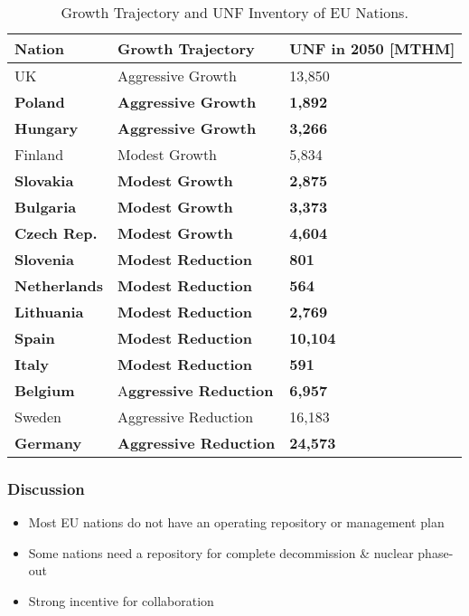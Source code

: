 \begin{frame}
\begin{table}[h]
\begin{adjustbox}{max totalsize={1.1\textwidth}{.8\textheight}, center}
\begin{tabularx}{\textwidth}{lbb}
                    \textbf{Nation} & \textbf{Growth Trajectory} & \small{\textbf{UNF in 2050 [MTHM] }}\\
                    \hline
                    UK & Aggressive Growth & 13,850\\
                    \hline
                    \textbf{Poland} & \textbf{Aggressive Growth} &  \textbf{1,892}\\
                    \hline
                    \textbf{Hungary} & \textbf{Aggressive Growth} & \textbf{3,266} \\ 
                    \hline
                    Finland & Modest Growth &  5,834\\
                    \hline
                    \textbf{Slovakia} & \textbf{Modest Growth} & \textbf{2,875}\\
                    \hline
                   \textbf{ Bulgaria} & \textbf{Modest Growth} & \textbf{3,373} \\
                    \hline
                    \textbf{Czech Rep.} & \textbf{Modest Growth} & \textbf{4,604}\\
                    \hline
                    \textbf{Slovenia} & \textbf{Modest Reduction} & \textbf{801}\\
                    \hline
                    \textbf{Netherlands} & \textbf{Modest Reduction} & \textbf{564}\\
                    \hline
                    \textbf{Lithuania} & \textbf{Modest Reduction} & \textbf{2,769}\\
                    \hline 
                    \textbf{Spain} & \textbf{Modest Reduction} &  \textbf{10,104} \\
                    \hline
                    \textbf{Italy} & \textbf{Modest Reduction} & \textbf{591}\\
                    \hline
                    \textbf{Belgium} & A\textbf{ggressive Reduction} & \textbf{6,957}\\
                    \hline
                    Sweden & Aggressive Reduction & 16,183\\
                    \hline
                    \textbf{Germany} & \textbf{Aggressive Reduction} & \textbf{24,573}\\
                    \hline
                    
                \end{tabularx}
    \end{adjustbox}
    \caption {Growth Trajectory and UNF Inventory of \gls{EU} Nations.}
    \label{tab:which_count}
\end{table}
\end{frame}


\begin{frame}
	\frametitle{Discussion}
	\begin{itemize}
		\item Most EU nations do not have an operating repository or management plan
		\item Some nations need a repository for complete decommission \& nuclear phase-out	
		\item Strong incentive for collaboration
	\end{itemize}
\end{frame}